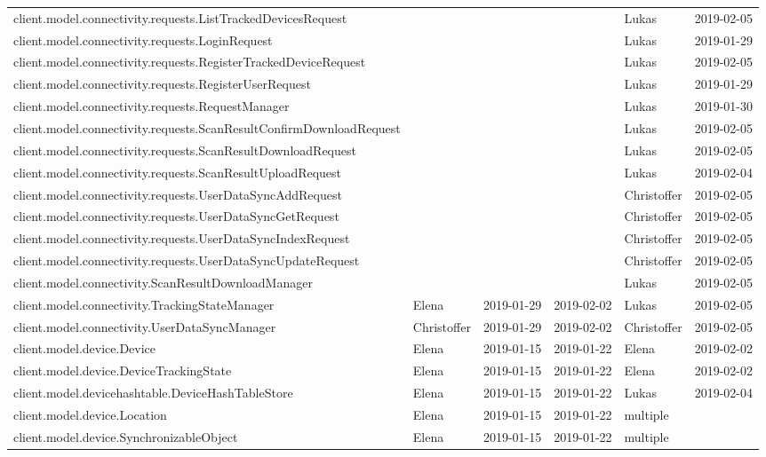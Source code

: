 \begin{adjustbox}{totalheight=\baselineskip}
\begin{tabular}{ l l r r l r }
client.model.connectivity.requests.ListTrackedDevicesRequest &  &  &  & Lukas & 2019-02-05 \\
client.model.connectivity.requests.LoginRequest &  &  &  & Lukas & 2019-01-29 \\
client.model.connectivity.requests.RegisterTrackedDeviceRequest &  &  &  & Lukas & 2019-02-05 \\
client.model.connectivity.requests.RegisterUserRequest &  &  &  & Lukas & 2019-01-29 \\
client.model.connectivity.requests.RequestManager &  &  &  & Lukas & 2019-01-30 \\
client.model.connectivity.requests.ScanResultConfirmDownloadRequest &  &  &  & Lukas & 2019-02-05 \\
client.model.connectivity.requests.ScanResultDownloadRequest &  &  &  & Lukas & 2019-02-05 \\
client.model.connectivity.requests.ScanResultUploadRequest &  &  &  & Lukas & 2019-02-04 \\
client.model.connectivity.requests.UserDataSyncAddRequest &  &  &  & Christoffer & 2019-02-05 \\
client.model.connectivity.requests.UserDataSyncGetRequest &  &  &  & Christoffer & 2019-02-05 \\
client.model.connectivity.requests.UserDataSyncIndexRequest &  &  &  & Christoffer & 2019-02-05 \\
client.model.connectivity.requests.UserDataSyncUpdateRequest &  &  &  & Christoffer & 2019-02-05 \\
client.model.connectivity.ScanResultDownloadManager &  &  &  & Lukas & 2019-02-05 \\
client.model.connectivity.TrackingStateManager & Elena & 2019-01-29 & 2019-02-02 & Lukas & 2019-02-05 \\
client.model.connectivity.UserDataSyncManager & Christoffer & 2019-01-29 & 2019-02-02 & Christoffer & 2019-02-05 \\
client.model.device.Device & Elena & 2019-01-15 & 2019-01-22 & Elena & 2019-02-02 \\
client.model.device.DeviceTrackingState & Elena & 2019-01-15 & 2019-01-22 & Elena & 2019-02-02 \\
client.model.devicehashtable.DeviceHashTableStore & Elena & 2019-01-15 & 2019-01-22 & Lukas & 2019-02-04 \\
client.model.device.Location & Elena & 2019-01-15 & 2019-01-22 & multiple &  \\
client.model.device.SynchronizableObject & Elena & 2019-01-15 & 2019-01-22 & multiple &  \\

\end{tabular}
\end{adjustbox}
